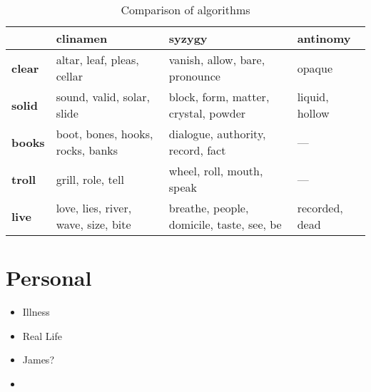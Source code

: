 \begin{table}[htb]
  \begin{tabu}{X[1,L]|X[3,L]X[3,L]X[2,L]}
  \toprule
  &
  \textbf{clinamen}
  &
  \textbf{syzygy}
  &
  \textbf{antinomy}
  \\ \midrule
  \textbf{clear}
  &
  altar, leaf, pleas, cellar
  &
  vanish, allow, bare, pronounce
  &
  opaque
  \\ \midrule
  \textbf{solid}
  &
  sound, valid, solar, slide
  &
  block, form, matter, crystal, powder
  &
  liquid, hollow
  \\ \midrule
  \textbf{books}
  &
  boot, bones, hooks, rocks, banks
  &
  dialogue, authority, record, fact
  &
  ---
  \\ \midrule
  \textbf{troll}
  &
  grill, role, tell
  &
  wheel, roll, mouth, speak
  &
  ---
  \\ \midrule
  \textbf{live}
  &
  love, lies, river, wave, size, bite
  &
  breathe, people, domicile, taste, see, be
  &
  recorded, dead
  \\ \bottomrule
  \end{tabu}
\caption[Comparison of algorithms]{Comparison of algorithms}
\label{algorithmscomp}
\end{table}


\section{Personal}

\begin{itemize}
  \item Illness
  \item Real Life
  \item James?
  \item
\end{itemize}


\stopcontents[chapters]
